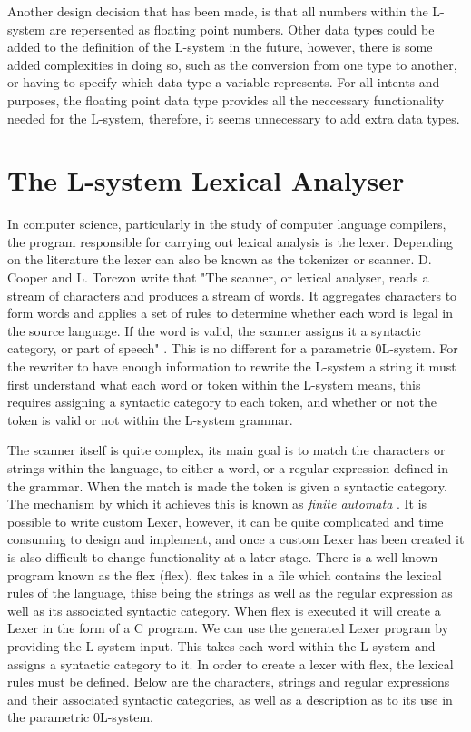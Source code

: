 Another design decision that has been made, is that all numbers within the L-system are repersented as floating point numbers. Other data types could be added to the definition of the L-system in the future, however, there is some added complexities in doing so, such as the conversion from one type to another, or having to specify which data type a variable represents. For all intents and purposes, the floating point data type provides all the neccessary functionality needed for the L-system, therefore, it seems unnecessary to add extra data types. 

\section{The L-system Lexical Analyser} \label{Flex}

In computer science, particularly in the study of computer language compilers, the program responsible for carrying out lexical analysis is the lexer. Depending on the literature the lexer can also be known as the tokenizer or scanner. D. Cooper and L. Torczon write that "The scanner, or lexical analyser, reads a stream of characters and produces a stream of words. It aggregates characters to form words and applies a set of rules to determine whether each word is legal in the source language. If the word is valid, the scanner assigns it a syntactic category, or part of speech" \cite{cooper2011engineering}. This is no different for a parametric 0L-system. For the rewriter to have enough information to rewrite the L-system a string it must first understand what each word or token within the L-system means, this requires assigning a syntactic category to each token, and whether or not the token is valid or not within the L-system grammar.  

The scanner itself is quite complex, its main goal is to match the characters or strings within the language, to either a word, or a regular expression defined in the grammar. When the match is made the token is given a syntactic category. The mechanism by which it achieves this is known as \textit{finite automata} \cite{wilhelm2013compiler}. It is possible to write custom \gls{Lexer}, however, it can be quite complicated and time consuming to design and implement, and once a custom \gls{Lexer} has been created it is also difficult to change functionality at a later stage. There is a well known program known as the \acrlong{flex} (\acrshort{flex}). \acrshort{flex} takes in a file which contains the lexical rules of the language, thise being the strings as well as the regular expression as well as its associated syntactic category. When \acrshort{flex} is executed it will create a \gls{Lexer} in the form of a C program. We can use the generated Lexer program by providing the L-system input. This takes each word within the L-system and assigns a syntactic category to it. In order to create a lexer with \acrshort{flex}, the lexical rules must be defined. Below are the characters, strings and regular expressions and their associated syntactic categories, as well as a description as to its use in the parametric 0L-system. 

